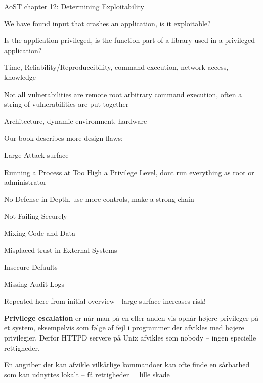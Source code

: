 \documentclass[Screen16to9,17pt]{foils}
\begin{document}


\begin{list2}
\item AoST chapter 12: Determining Exploitability
\item We have found input that crashes an application, is it exploitable?
\item Is the application privileged, is the function part of a library used in a privileged application?
\item Time, Reliability/Reproduccibility, command execution, network access, knowledge
\item Not all vulnerabilities are remote root arbitrary command execution, often a string of vulnerabilities are put together
\item Architecture, dynamic environment, hardware
\end{list2}


Our book describes more design flaws:
\begin{list2}
\item Large Attack surface
\item Running a Process at Too High a Privilege Level, dont run everything as root or administrator
\item No Defense in Depth, use more controls, make a strong chain
\item Not Failing Securely
\item Mixing Code and Data
\item Misplaced trust in External Systems
\item Insecure Defaults
\item Missing Audit Logs
\end{list2}

Repeated here from initial overview - large surface increases risk!


\begin{list1}
\item {\bfseries Privilege escalation} er når man på en eller anden vis
opnår højere privileger på et system, eksempelvis som
følge af fejl i programmer der afvikles med højere
privilegier. Derfor HTTPD servere på Unix afvikles som
nobody -- ingen specielle rettigheder.
\item En angriber der kan afvikle vilkårlige kommandoer kan ofte finde
  en sårbarhed som kan udnyttes lokalt -- få rettigheder = lille skade
\end{list1}
\end{document}
